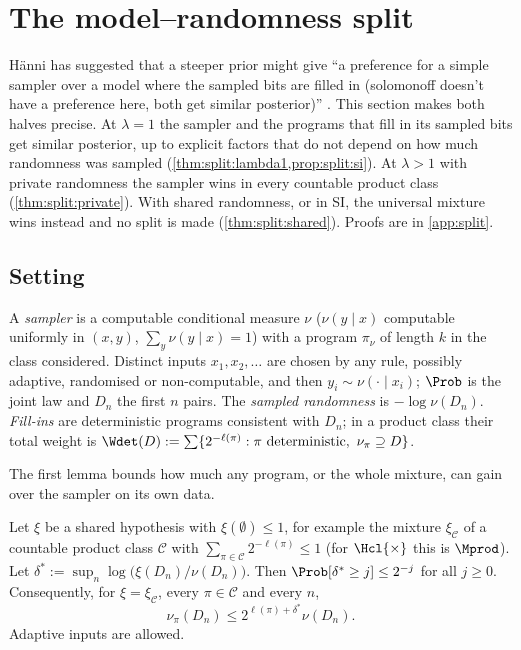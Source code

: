 \section{The model--randomness split}\label{sec:split}

H\"anni has suggested that a steeper prior might give ``a preference for a simple sampler over a model where the sampled bits are filled in (solomonoff doesn't have a preference here, both get similar posterior)'' \citep{hanni2026request}. This section makes both halves precise. At $\lambda=1$ the sampler and the programs that fill in its sampled bits get similar posterior, up to explicit factors that do not depend on how much randomness was sampled (\cref{thm:split:lambda1,prop:split:si}). At $\lambda>1$ with private randomness the sampler wins in every countable product class (\cref{thm:split:private}). With shared randomness, or in SI, the universal mixture wins instead and no split is made (\cref{thm:split:shared}). Proofs are in \cref{app:split}.

\subsection{Setting}\label{sec:split:setting}

\begin{definition}\label{def:split:setting}
A \emph{sampler} is a computable conditional measure $\nu$ ($\nu(y\mid x)$ computable uniformly in $(x,y)$, $\sum_y\nu(y\mid x)=1$) with a program $\pi_\nu$ of length $k$ in the class considered. Distinct inputs $x_1,x_2,\dots$ are chosen by any rule, possibly adaptive, randomised or non-computable, and then $y_i\sim\nu(\cdot\mid x_i)$; $\Prob$ is the joint law and $D_n$ the first $n$ pairs. The \emph{sampled randomness} is $-\log\nu(D_n)$. \emph{Fill-ins} are deterministic programs consistent with $D_n$; in a product class their total weight is $\Wdet(D):=\sum\{2^{-\ell(\pi)}:\pi\text{ deterministic},\ \nu_\pi\supseteq D\}$.
\end{definition}

The first lemma bounds how much any program, or the whole mixture, can gain over the sampler on its own data.

\begin{lemma}\label{lem:split:ville}
Let $\xi$ be a shared hypothesis with $\xi(\emptyset)\le1$, for example the mixture $\xi_{\mathcal C}$ of a countable product class $\mathcal C$ with $\sum_{\pi\in\mathcal C}2^{-\ell(\pi)}\le1$ (for $\Hcl{\times}$ this is $\Mprod$). Let $\delta^*:=\sup_n\log\big(\xi(D_n)/\nu(D_n)\big)$. Then $\Prob[\delta^*\ge j]\le2^{-j}$ for all $j\ge0$. Consequently, for $\xi=\xi_{\mathcal C}$, every $\pi\in\mathcal C$ and every $n$,
\[
\nu_\pi(D_n)\le2^{\ell(\pi)+\delta^*}\nu(D_n).
\]
Adaptive inputs are allowed.
\end{lemma}

